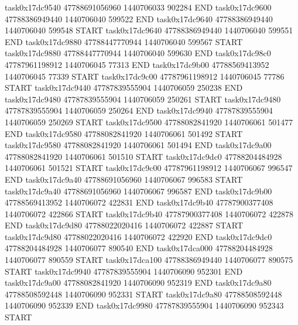 task0x17dc9540 47788691056960          1440706033               902284  END
task0x17dc9600 47788386949440          1440706040               599522  END
task0x17dc9640 47788386949440          1440706040               599548  START
task0x17dc9640 47788386949440          1440706040               599551  END
task0x17dc9880 47788447770944          1440706040               599567  START
task0x17dc9880 47788447770944          1440706040               599630  END
task0x17dc98c0 47787961198912          1440706045                77313  END
task0x17dc9b00 47788569413952          1440706045                77339  START
task0x17dc9c00 47787961198912          1440706045                77786  START
task0x17dc9440 47787839555904          1440706059               250238  END
task0x17dc9480 47787839555904          1440706059               250261  START
task0x17dc9480 47787839555904          1440706059               250264  END
task0x17dc9940 47787839555904          1440706059               250269  START
task0x17dc9500 47788082841920          1440706061               501477  END
task0x17dc9580 47788082841920          1440706061               501492  START
task0x17dc9580 47788082841920          1440706061               501494  END
task0x17dc9a00 47788082841920          1440706061               501510  START
task0x17dc9dc0 47788204484928          1440706061               501521  START
task0x17dc9c00 47787961198912          1440706067               996547  END
task0x17dc9a40 47788691056960          1440706067               996583  START
task0x17dc9a40 47788691056960          1440706067               996587  END
task0x17dc9b00 47788569413952          1440706072               422831  END
task0x17dc9b40 47787900377408          1440706072               422866  START
task0x17dc9b40 47787900377408          1440706072               422878  END
task0x17dc9d80 47788022020416          1440706072               422887  START
task0x17dc9d80 47788022020416          1440706072               422920  END
task0x17dc9dc0 47788204484928          1440706077               890540  END
task0x17dca000 47788204484928          1440706077               890559  START
task0x17dca100 47788386949440          1440706077               890575  START
task0x17dc9940 47787839555904          1440706090               952301  END
task0x17dc9a00 47788082841920          1440706090               952319  END
task0x17dc9a80 47788508592448          1440706090               952331  START
task0x17dc9a80 47788508592448          1440706090               952339  END
task0x17dc9980 47787839555904          1440706090               952343  START
